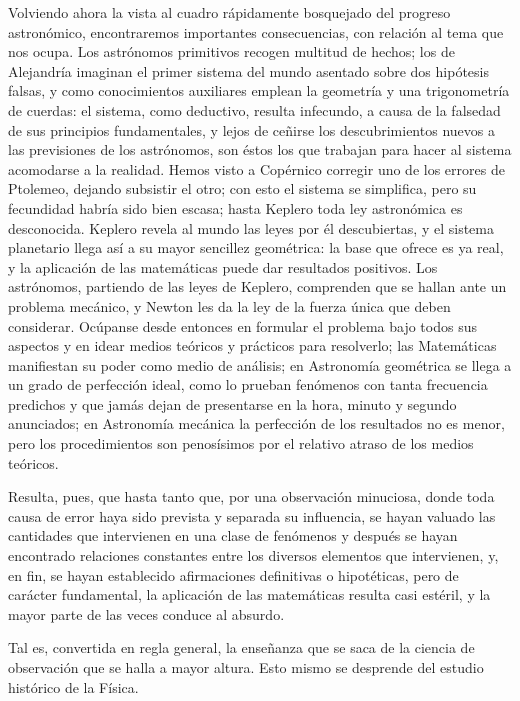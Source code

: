 \documentclass[a4paper, 12pt]{article}
\begin{document}
Volviendo ahora la vista al cuadro rápidamente bosquejado del progreso astronómico, encontraremos importantes consecuencias, con relación al tema que nos ocupa. Los astrónomos primitivos recogen multitud de hechos; los de Alejandría imaginan el primer sistema del mundo asentado sobre dos hipótesis falsas, y como conocimientos auxiliares  emplean la geometría y una trigonometría de cuerdas: el sistema, como deductivo, resulta infecundo, a causa de la falsedad de sus principios fundamentales, y lejos de ceñirse los descubrimientos nuevos a las previsiones de los astrónomos, son éstos los que trabajan para hacer al sistema acomodarse a la realidad. Hemos visto a Copérnico corregir uno de los errores de Ptolemeo, dejando subsistir el otro; con esto el sistema se simplifica, pero su fecundidad habría sido bien escasa; hasta Keplero toda ley astronómica es desconocida. Keplero revela al mundo las leyes por él descubiertas, y el sistema planetario llega así a su mayor sencillez geométrica: la base que ofrece es ya real, y la aplicación de las matemáticas puede dar resultados positivos. Los astrónomos, partiendo de las leyes de Keplero, comprenden que se hallan ante un problema mecánico, y Newton les da la ley de la fuerza única que deben considerar. Ocúpanse desde entonces en formular el problema bajo todos sus aspectos y en idear medios teóricos y prácticos para resolverlo; las Matemáticas manifiestan su poder como medio de análisis; en Astronomía geométrica se llega a un grado de perfección ideal, como lo prueban fenómenos con tanta frecuencia predichos y que jamás dejan de presentarse en la hora, minuto y segundo anunciados; en Astronomía mecánica la perfección de los resultados no es menor, pero los procedimientos son penosísimos por el relativo atraso de los medios teóricos.

Resulta, pues, que hasta tanto que, por una observación minuciosa, donde toda causa de error haya sido prevista y separada su influencia, se hayan valuado las cantidades que intervienen en una clase de fenómenos y después se hayan encontrado relaciones constantes entre los diversos elementos que intervienen, y, en fin, se hayan establecido afirmaciones definitivas o hipotéticas, pero de carácter fundamental, la aplicación de las matemáticas resulta casi estéril, y la mayor parte de las veces conduce al absurdo.

Tal es, convertida en regla general, la enseñanza que se saca de la ciencia de observación que se halla a mayor altura. Esto mismo se desprende del estudio histórico de la Física.
\end{document}
